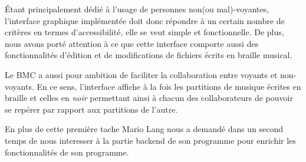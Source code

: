 Étant principalement dédié à l'usage de personnes non(ou
mal)-voyantes, l'interface graphique implémentée doit donc répondre à
un certain nombre de critères en termes d'accessibilité, elle se veut
simple et fonctionnelle.  De plus, nous avons porté attention à ce que
cette interface comporte aussi des fonctionnalités d'édition et de
modifications de fichiers écrits en braille musical.
   
Le BMC a aussi pour ambition de faciliter la collaboration entre
voyants et non-voyants. En ce sens, l'interface affiche à la fois les
partitions de musique écrites en braille et celles en \textit{noir}
permettant ainsi à chacun des collaborateurs de pouvoir se repérer par
rapport aux partitions de l'autre.

En plus de cette première tache Mario Lang nous a demandé dans un
second temps de nous interesser à la partie backend de son programme
pour enrichir les fonctionnalités de son programme.
